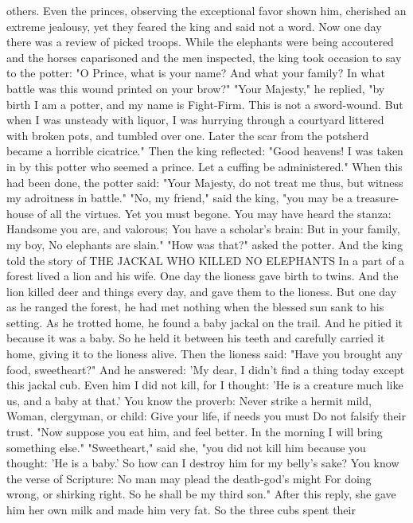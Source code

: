 \documentclass{book}
\begin{document}
others. Even the princes, observing the exceptional
favor shown him, cherished an extreme jealousy, yet
they feared the king and said not a word.
Now one day there was a review of picked troops.
While the elephants were being accoutered and the
horses caparisoned and the men inspected, the king
took occasion to say to the potter: "O Prince, what is
your name? And what your family? In what battle
was this wound printed on your brow?"
"Your Majesty," he replied, "by birth I am a
potter, and my name is Fight-Firm. This is not a
sword-wound. But when I was unsteady with liquor,
I was hurrying through a courtyard littered with
broken pots, and tumbled over one. Later the scar
from the potsherd became a horrible cicatrice."
Then the king reflected: "Good heavens! I was
taken in by this potter who seemed a prince. Let a
cuffing be administered."
When this had been done, the potter said: "Your
Majesty, do not treat me thus, but witness my
adroitness in battle." "No, my friend," said the king,
"you may be a treasure-house of all the virtues. Yet
you must begone. You may have heard the stanza:
Handsome you are, and valorous;
You have a scholar's brain:
But in your family, my boy,
No elephants are slain."
"How was that?" asked the potter. And the king
told the story of
THE JACKAL WHO KILLED NO ELEPHANTS
In a part of a forest lived a lion and his wife. One
day the lioness gave birth to twins. And the lion
killed deer and things every day, and gave them to
the lioness.
But one day as he ranged the forest, he had met
nothing when the blessed sun sank to his setting.
As he trotted home, he found a baby jackal on the
trail. And he pitied it because it was a baby. So he
held it between his teeth and carefully carried it
home, giving it to the lioness alive.
Then the lioness said: "Have you brought any
food, sweetheart?" And he answered: 'My dear, I
didn't find a thing today except this jackal cub. Even
him I did not kill, for I thought: 'He is a creature
much like us, and a baby at that.' You know the
proverb:
Never strike a hermit mild,
Woman, clergyman, or child:
Give your life, if needs you must
Do not falsify their trust.
"Now suppose you eat him, and feel better.   In
the morning I will bring something else."
"Sweetheart," said she, "you did not kill him
because you thought: 'He is a baby.' So how can I
destroy him for my belly's sake? You know the verse
of Scripture:
No man may plead the death-god's might
For doing wrong, or shirking right.
So he shall be my third son."
After this reply, she gave him her own milk and
made him very fat. So the three cubs spent their
\end{document}
